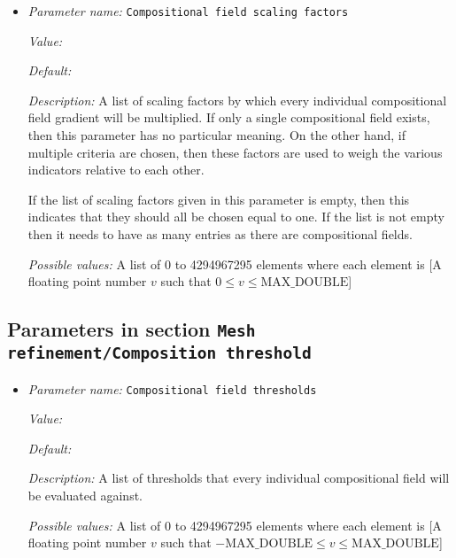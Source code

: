 \begin{itemize}
\item {\it Parameter name:} {\tt Compositional field scaling factors}
\label{parameters:Mesh refinement/Composition gradient/Compositional field scaling factors}
\label{parameters:Mesh_20refinement/Composition_20gradient/Compositional_20field_20scaling_20factors}


{\it Value:} 


{\it Default:} 


{\it Description:} A list of scaling factors by which every individual compositional field gradient will be multiplied. If only a single compositional field exists, then this parameter has no particular meaning. On the other hand, if multiple criteria are chosen, then these factors are used to weigh the various indicators relative to each other. 

If the list of scaling factors given in this parameter is empty, then this indicates that they should all be chosen equal to one. If the list is not empty then it needs to have as many entries as there are compositional fields.


{\it Possible values:} A list of 0 to 4294967295 elements where each element is [A floating point number $v$ such that $0 \leq v \leq \text{MAX\_DOUBLE}$]
\end{itemize}

\subsection{Parameters in section \tt Mesh refinement/Composition threshold}
\label{parameters:Mesh_20refinement/Composition_20threshold}

\begin{itemize}
\item {\it Parameter name:} {\tt Compositional field thresholds}
\label{parameters:Mesh refinement/Composition threshold/Compositional field thresholds}
\label{parameters:Mesh_20refinement/Composition_20threshold/Compositional_20field_20thresholds}


{\it Value:} 


{\it Default:} 


{\it Description:} A list of thresholds that every individual compositional field will be evaluated against.


{\it Possible values:} A list of 0 to 4294967295 elements where each element is [A floating point number $v$ such that $-\text{MAX\_DOUBLE} \leq v \leq \text{MAX\_DOUBLE}$]
\end{itemize}

